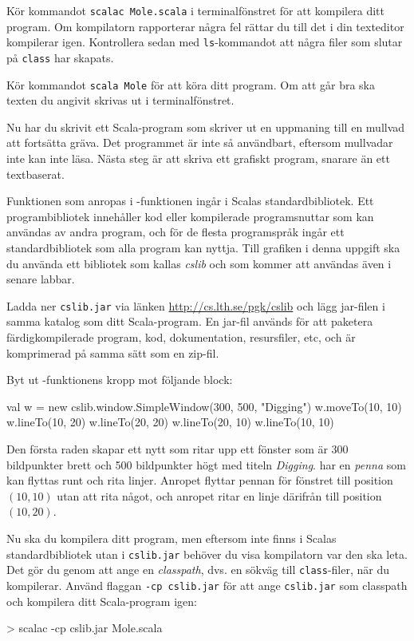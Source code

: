\Subtask
Kör kommandot \texttt{scalac Mole.scala} i terminalfönstret för att kompilera ditt program.
Om kompilatorn rapporterar några fel rättar du till det i din texteditor kompilerar igen.
Kontrollera sedan med \texttt{ls}-kommandot att några filer som slutar på \texttt{class} har skapats.

\Subtask
Kör kommandot \texttt{scala Mole} för att köra ditt program.
Om att går bra ska texten du angivit skrivas ut i terminalfönstret.


\Task
Nu har du skrivit ett Scala-program som skriver ut en uppmaning till en mullvad att fortsätta gräva.
Det programmet är inte så användbart, eftersom mullvadar inte kan inte läsa.
Nästa steg är att skriva ett grafiskt program, snarare än ett textbaserat.

Funktionen  som anropas i -funktionen ingår i Scalas standardbibliotek.
Ett programbibliotek innehåller kod eller kompilerade programsnuttar som kan användas av andra program, och för de flesta programspråk ingår ett standardbibliotek som alla program kan nyttja.
Till grafiken i denna uppgift ska du använda ett bibliotek som kallas \emph{cslib} och som kommer att användas även i senare labbar.

\Subtask

Ladda ner \texttt{cslib.jar} via länken \url{http://cs.lth.se/pgk/cslib} och lägg jar-filen i samma katalog som ditt Scala-program.
En jar-fil används för att paketera färdigkompilerade program, kod, dokumentation, resursfiler, etc, och är komprimerad på samma sätt som en zip-fil.

\Subtask
Byt ut -funktionens kropp mot följande block:
\begin{Code}
{
	val w = new cslib.window.SimpleWindow(300, 500, "Digging")
	w.moveTo(10, 10)
	w.lineTo(10, 20)
	w.lineTo(20, 20)
	w.lineTo(20, 10)
	w.lineTo(10, 10)
}
\end{Code}
Den första raden skapar ett nytt  som ritar upp ett fönster som är 300 bildpunkter brett och 500 bildpunkter högt med titeln \emph{Digging}.
 har en \emph{penna} som kan flyttas runt och rita linjer.
Anropet  flyttar pennan för fönstret  till position $(10,10)$ utan att rita något, och anropet  ritar en linje därifrån till position $(10, 20)$.

\Subtask
Nu ska du kompilera ditt program, men eftersom  inte finns i Scalas standardbibliotek utan i \texttt{cslib.jar} behöver du visa kompilatorn var den ska leta.
Det gör du genom att ange en \emph{classpath}, dvs. en sökväg till \texttt{class}-filer, när du kompilerar.
Använd flaggan \texttt{-cp cslib.jar} för att ange \texttt{cslib.jar} som classpath och kompilera ditt Scala-program igen:
\begin{REPLnonum}
> scalac -cp cslib.jar Mole.scala
\end{REPLnonum}

